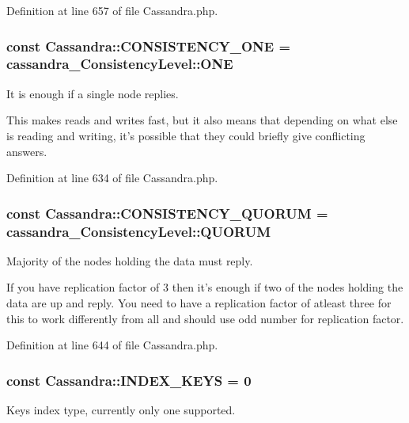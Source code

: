 Definition at line 657 of file Cassandra.php.

\hypertarget{classCassandra_afd35e5b7419ce2915891c349a44b6f22}{
\subsubsection[{CONSISTENCY\_\-ONE}]{\setlength{\rightskip}{0pt plus 5cm}const {\bf Cassandra::CONSISTENCY\_\-ONE} = cassandra\_\-ConsistencyLevel::ONE}}
\label{classCassandra_afd35e5b7419ce2915891c349a44b6f22}
It is enough if a single node replies.

This makes reads and writes fast, but it also means that depending on what else is reading and writing, it's possible that they could briefly give conflicting answers. 

Definition at line 634 of file Cassandra.php.

\hypertarget{classCassandra_a58c08b49c2434526a62f74248c8b959d}{
\subsubsection[{CONSISTENCY\_\-QUORUM}]{\setlength{\rightskip}{0pt plus 5cm}const {\bf Cassandra::CONSISTENCY\_\-QUORUM} = cassandra\_\-ConsistencyLevel::QUORUM}}
\label{classCassandra_a58c08b49c2434526a62f74248c8b959d}
Majority of the nodes holding the data must reply.

If you have replication factor of 3 then it's enough if two of the nodes holding the data are up and reply. You need to have a replication factor of atleast three for this to work differently from all and should use odd number for replication factor. 

Definition at line 644 of file Cassandra.php.

\hypertarget{classCassandra_aa3d7e3c4c9454133e7b21165bb7c3953}{
\subsubsection[{INDEX\_\-KEYS}]{\setlength{\rightskip}{0pt plus 5cm}const {\bf Cassandra::INDEX\_\-KEYS} = 0}}
\label{classCassandra_aa3d7e3c4c9454133e7b21165bb7c3953}
Keys index type, currently only one supported. 

